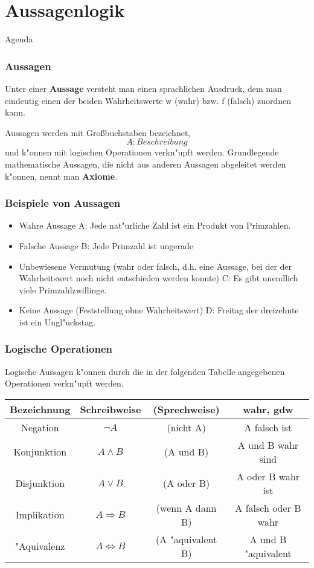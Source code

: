 \documentclass{beamer}
\begin{document}
\section{Aussagenlogik}
\begin{frame}{Agenda}
   
    
  \tableofcontents[currentsection]
  \end{frame}
\begin{frame}
\frametitle{Aussagen}

Unter einer \textbf{Aussage} versteht man einen sprachlichen Ausdruck, dem man eindeutig einen der beiden Wahrheitswerte w (\glqq wahr\grqq) bzw. f (\glqq falsch\grqq) zuordnen kann. 

Aussagen werden mit Gro\ss buchstaben bezeichnet, \[A:Beschreibung\]
und k"onnen mit logischen Operationen verkn"upft werden. Grundlegende mathematische Aussagen, die nicht aus anderen Aussagen abgeleitet werden k"onnen, nennt man \textbf{Axiome}.
\end{frame}

\begin{frame}
  \frametitle{Beispiele von Aussagen}
  \begin{itemize}
    \item Wahre Aussage A: Jede nat"urliche Zahl ist ein Produkt von Primzahlen.
    \item Falsche Aussage B: Jede Primzahl ist ungerade
    \item Unbewiesene Vermutung (wahr oder falsch, d.h. eine Aussage, bei der der Wahrheitswert noch nicht entschieden werden konnte) C: Es gibt unendlich viele Primzahlzwillinge.
    \item Keine Aussage (Feststellung ohne Wahrheitswert) D: Freitag der dreizehnte ist ein Ungl"uckstag.
  \end{itemize}
      
\end{frame}

\begin{frame}
  \frametitle{Logische Operationen}
  Logische Aussagen k"onnen durch die in der folgenden Tabelle angegebenen Operationen verkn"upft werden.
  
  \begin{tabular}[h]{c|cc|c}
   
    Bezeichnung & Schreibweise & (Sprechweise) & wahr, gdw \\
    \hline
    Negation & $\neg A$ & (nicht A) & A falsch ist \\
    Konjunktion & $A\wedge B$ & (A und B) & A und B wahr sind \\
    Disjunktion & $A\vee B$ & (A oder B) & A oder B wahr ist \\
    Implikation & $A\Rightarrow B$ & (wenn A dann B) & A falsch oder B wahr \\
    "Aquivalenz & $A\Leftrightarrow B$ & (A "aquivalent B) & A und B "aquivalent 


    \end{tabular}
\end{frame}
\end{document}
